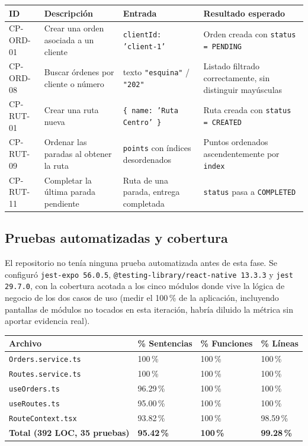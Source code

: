 \documentclass[11pt,a4paper]{article}
\begin{document}
\begin{longtable}{p{1.7cm} p{4.6cm} p{4.1cm} p{4.1cm}}
\toprule
\textbf{ID} & \textbf{Descripción} & \textbf{Entrada} & \textbf{Resultado esperado} \\
\midrule
\endhead
CP-ORD-01 & Crear una orden asociada a un cliente & \texttt{clientId: 'client-1'} & Orden creada con \texttt{status = PENDING} \\
CP-ORD-08 & Buscar órdenes por cliente o número & texto \texttt{"esquina"} / \texttt{"202"} & Listado filtrado correctamente, sin distinguir mayúsculas \\
CP-RUT-01 & Crear una ruta nueva & \texttt{\{ name: 'Ruta Centro' \}} & Ruta creada con \texttt{status = CREATED} \\
CP-RUT-09 & Ordenar las paradas al obtener la ruta & \texttt{points} con índices desordenados & Puntos ordenados ascendentemente por \texttt{index} \\
CP-RUT-11 & Completar la última parada pendiente & Ruta de una parada, entrega completada & \texttt{status} pasa a \texttt{COMPLETED} \\
\bottomrule
\end{longtable}

\subsection{Pruebas automatizadas y cobertura}
\label{sec:pruebas}

El repositorio no tenía ninguna prueba automatizada antes de esta fase. Se configuró
\texttt{jest-expo 56.0.5}, \texttt{@testing-library/react-native 13.3.3} y \texttt{jest
29.7.0}, con la cobertura acotada a los cinco módulos donde vive la lógica de negocio de
los dos casos de uso (medir el 100\,\% de la aplicación, incluyendo pantallas de módulos no
tocados en esta iteración, habría diluido la métrica sin aportar evidencia real).

\begin{longtable}{p{6.5cm} p{2.2cm} p{2.2cm} p{2.2cm}}
\toprule
\textbf{Archivo} & \textbf{\% Sentencias} & \textbf{\% Funciones} & \textbf{\% Líneas} \\
\midrule
\endhead
\texttt{Orders.service.ts} & 100\,\% & 100\,\% & 100\,\% \\
\texttt{Routes.service.ts} & 100\,\% & 100\,\% & 100\,\% \\
\texttt{useOrders.ts} & 96.29\,\% & 100\,\% & 100\,\% \\
\texttt{useRoutes.ts} & 95.00\,\% & 100\,\% & 100\,\% \\
\texttt{RouteContext.tsx} & 93.82\,\% & 100\,\% & 98.59\,\% \\
\midrule
\textbf{Total (392 LOC, 35 pruebas)} & \textbf{95.42\,\%} & \textbf{100\,\%} & \textbf{99.28\,\%} \\
\bottomrule
\end{longtable}
\end{document}
